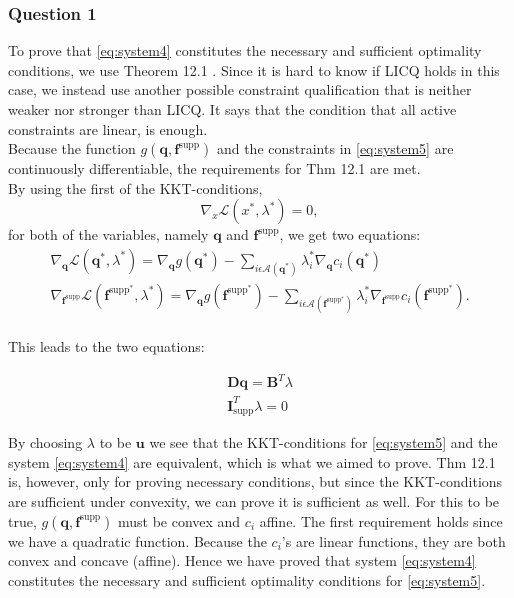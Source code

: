 \documentclass[10pt,a4paper]{article}
\begin{document}
\subsubsection*{Question 1}
To prove that \eqref{eq:system4} constitutes the necessary and sufficient optimality conditions, we use Theorem 12.1 \cite{NW}. Since it is hard to know if LICQ holds in this case, we instead use another possible constraint qualification that is neither weaker nor stronger than LICQ. It says that the condition that all active constraints are linear, is enough. 
\\
Because the function $g(\bm{q},\bm{f}^{\textrm{supp}})$ and the constraints in \eqref{eq:system5} are continuously differentiable, the requirements for Thm 12.1 are met.
\\
By using the first of the KKT-conditions,
\begin{equation}
\nabla_{x}\mathcal{L}(x^{\ast},\lambda^{\ast}) = 0,
\end{equation}
for both of the variables, namely $\bm{q}$ and $\bm{f}^{\textrm{supp}}$, we get two equations:
\begin{equation}
\begin{aligned}
\nabla_{\bm{q}}\mathcal{L}(\bm{q}^{\ast},\lambda^{\ast}) = \nabla_{\bm{q}}g(\bm{q^{\ast}}) - \sum_{i\epsilon\mathcal{A}(\bm{q}^{\ast})}\lambda_{i}^{\ast}\nabla_{\bm{q}}c_{i}(\bm{q}^{\ast}) \\
\nabla_{\bm{f}^{\textrm{supp}}}\mathcal{L}(\bm{f}^{\textrm{supp}^{\ast}}, \lambda^{\ast}) = \nabla_{\bm{q}}g(\bm{f}^{\textrm{supp}^{\ast}}) - \sum_{i\epsilon\mathcal{A}(\bm{f}^{\textrm{supp}^{\ast}})}\lambda_{i}^{\ast}\nabla_{\bm{f}^{\textrm{supp}}}c_{i}(\bm{f}^{\textrm{supp}^{\ast}}).\\
\end{aligned}
\end{equation}

This leads to the two equations:

\begin{equation}
\begin{aligned}
\bm{Dq} = \bm{B}^{T}\lambda\\
\bm{I}^{T}_{\textrm{supp}}\lambda = 0
\end{aligned}
\end{equation}

By choosing $\lambda$ to be $\bm{u}$ we see that the KKT-conditions for \eqref{eq:system5} and the system \eqref{eq:system4} are equivalent, which is what we aimed to prove. Thm 12.1 is, however, only for proving necessary conditions, but since the KKT-conditions are sufficient under convexity, we can prove it is sufficient as well. For this to be true, $g(\bm{q},\bm{f}^{\textrm{supp}})$ must be convex and $c_{i}$ affine. The first requirement holds since we have a quadratic function. Because the $c_{i}$'s are linear functions, they are both convex and concave (affine). Hence we have proved that system \eqref{eq:system4} constitutes the necessary and sufficient optimality conditions for \eqref{eq:system5}.
\end{document}
